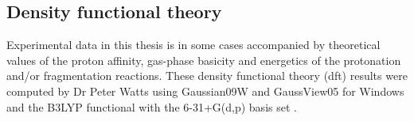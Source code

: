 \subsection{Density functional theory}
Experimental data in this thesis is in some cases accompanied by theoretical values of the proton affinity, gas-phase basicity and energetics of the protonation and/or fragmentation reactions.
These density functional theory (\acrshort{dft}) results were computed   by Dr Peter Watts using  
Gaussian09W and GaussView05 for Windows  and the B3LYP functional with the 6-31+G(d,p) basis set  \cite{frisch2009gaussian}.







